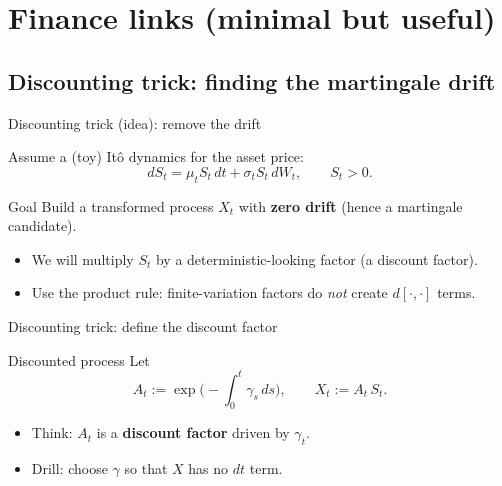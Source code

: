 \documentclass[10pt,aspectratio=169]{beamer}
\begin{document}
\section{Finance links (minimal but useful)}

\subsection{Discounting trick: finding the martingale drift}

\begin{frame}{Discounting trick (idea): remove the drift}

Assume a (toy) It\^o dynamics for the asset price:
\[
dS_t = \mu_t S_t\,dt + \sigma_t S_t\,dW_t,
\qquad S_t>0.
\]\pause

\begin{block}{Goal}
Build a transformed process $X_t$ with \textbf{zero drift} (hence a martingale candidate).
\end{block}\pause

\begin{itemize}
  \item We will multiply $S_t$ by a deterministic-looking factor (a discount factor).\pause
  \item Use the product rule: finite-variation factors do \emph{not} create $d[\cdot,\cdot]$ terms.
\end{itemize}

\end{frame}

\begin{frame}{Discounting trick: define the discount factor}

\begin{block}{Discounted process}
Let
\[
A_t := \exp\!\Big(-\int_0^t \gamma_s\,ds\Big),
\qquad
X_t := A_t\,S_t.
\]
\end{block}\pause

\begin{itemize}
  \item Think: $A_t$ is a \textbf{discount factor} driven by $\gamma_t$.\pause
  \item Drill: choose $\gamma$ so that $X$ has no $dt$ term.
\end{itemize}

\end{frame}
\end{document}
